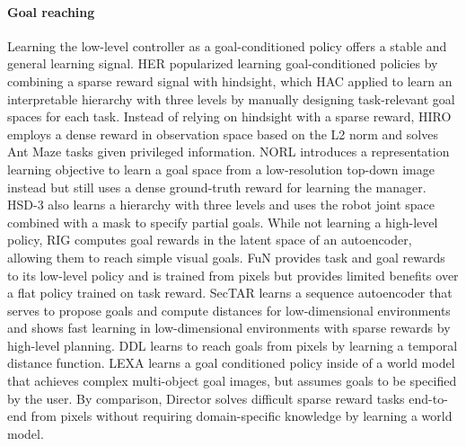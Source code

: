 \paragraph{Goal reaching}

Learning the low-level controller as a goal-conditioned policy offers a stable and general learning signal. 
HER \citep{andrychowicz2017her} popularized learning goal-conditioned policies by combining a sparse reward signal with hindsight, which HAC \citep{levy2017hac} applied to learn an interpretable hierarchy with three levels by manually designing task-relevant goal spaces for each task. 
Instead of relying on hindsight with a sparse reward, HIRO \citep{nachum2018hiro} employs a dense reward in observation space based on the L2 norm and solves Ant Maze tasks given privileged information. 
NORL \citep{nachum2018norl} introduces a representation learning objective to learn a goal space from a low-resolution top-down image instead but still uses a dense ground-truth reward for learning the manager. 
HSD-3 \citep{gehring2021hsd3} also learns a hierarchy with three levels and uses the robot joint space combined with a mask to specify partial goals. 
While not learning a high-level policy, RIG \citep{nair2018rig} computes goal rewards in the latent space of an autoencoder, allowing them to reach simple visual goals. 
FuN \citep{vezhnevets2017fun} provides task and goal rewards to its low-level policy and is trained from pixels but provides limited benefits over a flat policy trained on task reward. 
SecTAR \citep{co2018sectar} learns a sequence autoencoder that serves to propose goals and compute distances for low-dimensional environments and shows fast learning in low-dimensional environments with sparse rewards by high-level planning. 
DDL \citep{hartikainen2019ddl} learns to reach goals from pixels by learning a temporal distance function. 
LEXA \citep{mendonca2021lexa} learns a goal conditioned policy inside of a world model that achieves complex multi-object goal images, but assumes goals to be specified by the user. 
By comparison, Director solves difficult sparse reward tasks end-to-end from pixels without requiring domain-specific knowledge by learning a world model.
